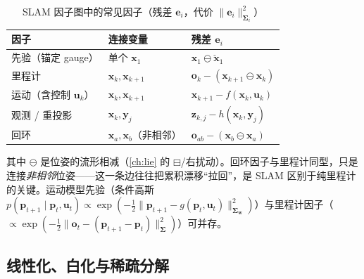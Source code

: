 \begin{table}[H]\centering\small
\caption{SLAM 因子图中的常见因子（残差 $\mathbf{e}_i$，代价 $\|\mathbf{e}_i\|_{\boldsymbol{\Sigma}_i}^2$）}
\label{tab:factors}
\begin{tabular}{lll}
\toprule
因子 & 连接变量 & 残差 $\mathbf{e}_i$ \\
\midrule
先验（锚定 gauge） & 单个 $\mathbf{x}_1$ & $\mathbf{x}_1\ominus\check{\mathbf{x}}_1$ \\
里程计 & $\mathbf{x}_k,\mathbf{x}_{k+1}$ & $\mathbf{o}_k-(\mathbf{x}_{k+1}\ominus\mathbf{x}_k)$ \\
运动（含控制 $\mathbf{u}_k$） & $\mathbf{x}_k,\mathbf{x}_{k+1}$ & $\mathbf{x}_{k+1}-f(\mathbf{x}_k,\mathbf{u}_k)$ \\
观测 / 重投影 & $\mathbf{x}_k,\mathbf{y}_j$ & $\mathbf{z}_{k,j}-h(\mathbf{x}_k,\mathbf{y}_j)$ \\
回环 & $\mathbf{x}_a,\mathbf{x}_b$（非相邻） & $\mathbf{o}_{ab}-(\mathbf{x}_b\ominus\mathbf{x}_a)$ \\
\bottomrule
\end{tabular}
\end{table}

\noindent 其中 $\ominus$ 是位姿的流形相减（\cref{ch:lie} 的 $\boxminus$/右扰动）。回环因子与里程计同型，只是连接\emph{非相邻}位姿——这一条边往往把累积漂移“拉回”，是 SLAM 区别于纯里程计的关键。运动模型先验（条件高斯 $p(\mathbf{p}_{t+1}\mid\mathbf{p}_t,\mathbf{u}_t)\propto\exp(-\tfrac12\|\mathbf{p}_{t+1}-g(\mathbf{p}_t,\mathbf{u}_t)\|_{\boldsymbol{\Sigma}_{\mathbf{w}}}^2)$）与里程计因子（$\propto\exp(-\tfrac12\|\mathbf{o}_t-(\mathbf{p}_{t+1}-\mathbf{p}_t)\|_{\boldsymbol{\Sigma}}^2)$）可并存\cite{carlone2026handbook}。

\subsection{线性化、白化与稀疏分解}
\label{sec:est-fg-linear}

